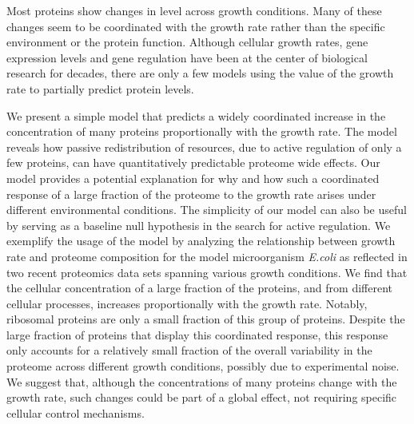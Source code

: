 Most proteins show changes in level across growth conditions.
Many of these changes seem to be coordinated with the growth rate rather than the specific environment or the protein function.
Although cellular growth rates, gene expression levels and gene regulation have been at the center of biological research for decades, there are only a few models using the value of the growth rate to partially predict protein levels.

We present a simple model that predicts a widely coordinated increase in the concentration of many proteins proportionally with the growth rate. The model reveals how passive redistribution of resources, due to active regulation of only a few proteins, can have quantitatively predictable proteome wide effects.
Our model provides a potential explanation for why and how such a coordinated response of a large fraction of the proteome to the growth rate arises under different environmental conditions.
The simplicity of our model can also be useful by serving as a baseline null hypothesis in the search for active regulation.
We exemplify the usage of the model by analyzing the relationship between growth rate and proteome composition for the model microorganism \emph{E.coli} as reflected in two recent proteomics data sets spanning various growth conditions.
We find that the cellular concentration of a large fraction of the proteins, and from different cellular processes, increases proportionally with the growth rate. Notably, ribosomal proteins are only a small fraction of this group of proteins.
Despite the large fraction of proteins that display this coordinated response, this response only accounts for a relatively small fraction of the overall variability in the proteome across different growth conditions, possibly due to experimental noise.
We suggest that, although the concentrations of many proteins change with the growth rate, such changes could be part of a global effect, not requiring specific cellular control mechanisms.